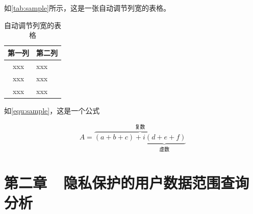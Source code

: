 \par 如\autoref{tab:sample}所示，这是一张自动调节列宽的表格。

\begin{table}[htbp]
    \caption{\label{tab:sample}自动调节列宽的表格}
    \begin{tabularx}{\linewidth}{c|X<{\centering}}
        \hline
        第一列 & 第二列 \\ \hline
        xxx & xxx \\ \hline
        xxx & xxx \\ \hline
        xxx & xxx \\ \hline
    \end{tabularx}
\end{table}


\par 如\autoref{equ:sample}，这是一个公式

\begin{equation}
    \label{equ:sample}
    A=\overbrace{(a+b+c)+\underbrace{i(d+e+f)}_{\text{虚数}}}^{\text{复数}}
\end{equation}




\chapter{第二章~~隐私保护的用户数据范围查询分析}

